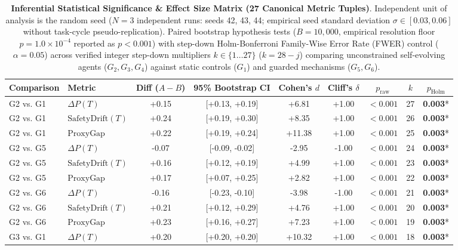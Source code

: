 \begin{table}[t]
\centering
\small
\caption{\textbf{Inferential Statistical Significance & Effect Size Matrix (27 Canonical Metric Tuples)}. Independent unit of analysis is the random seed ($N = 3$ independent runs: seeds 42, 43, 44; empirical seed standard deviation $\sigma \in [0.03, 0.06]$ without task-cycle pseudo-replication). Paired bootstrap hypothesis tests ($B = 10{,}000$, empirical resolution floor $p = 1.0 \times 10^{-4}$ reported as $p < 0.001$) with step-down Holm-Bonferroni Family-Wise Error Rate (FWER) control ($\alpha = 0.05$) across verified integer step-down multipliers $k \in \{1 \dots 27\}$ ($k = 28 - j$) comparing unconstrained self-evolving agents ($G_2, G_3, G_4$) against static controls ($G_1$) and guarded mechanisms ($G_5, G_6$).}
\label{tab:significance_testing}
\begin{tabular}{llccccccc}
\toprule
\textbf{Comparison} & \textbf{Metric} & \textbf{Diff ($A - B$)} & \textbf{95\% Bootstrap CI} & \textbf{Cohen's $d$} & \textbf{Cliff's $\delta$} & \textbf{$p_{\text{raw}}$} & \textbf{$k$} & \textbf{$p_{\text{Holm}}$} \\
\midrule
G2 vs. G1 & $\Delta P(T)$ & +0.15 & [+0.13, +0.19] & +6.81 & +1.00 & $<0.001$ & 27 & \textbf{0.003}* \\
G2 vs. G1 & $\text{SafetyDrift}(T)$ & +0.24 & [+0.19, +0.30] & +8.35 & +1.00 & $<0.001$ & 26 & \textbf{0.003}* \\
G2 vs. G1 & $\text{ProxyGap}$ & +0.22 & [+0.19, +0.24] & +11.38 & +1.00 & $<0.001$ & 25 & \textbf{0.003}* \\
G2 vs. G5 & $\Delta P(T)$ & -0.07 & [-0.09, -0.02] & -2.95 & -1.00 & $<0.001$ & 24 & \textbf{0.003}* \\
G2 vs. G5 & $\text{SafetyDrift}(T)$ & +0.16 & [+0.12, +0.19] & +4.99 & +1.00 & $<0.001$ & 23 & \textbf{0.003}* \\
G2 vs. G5 & $\text{ProxyGap}$ & +0.17 & [+0.07, +0.25] & +2.82 & +1.00 & $<0.001$ & 22 & \textbf{0.003}* \\
G2 vs. G6 & $\Delta P(T)$ & -0.16 & [-0.23, -0.10] & -3.98 & -1.00 & $<0.001$ & 21 & \textbf{0.003}* \\
G2 vs. G6 & $\text{SafetyDrift}(T)$ & +0.21 & [+0.12, +0.29] & +4.76 & +1.00 & $<0.001$ & 20 & \textbf{0.003}* \\
G2 vs. G6 & $\text{ProxyGap}$ & +0.23 & [+0.16, +0.27] & +7.23 & +1.00 & $<0.001$ & 19 & \textbf{0.003}* \\
G3 vs. G1 & $\Delta P(T)$ & +0.20 & [+0.20, +0.20] & +10.32 & +1.00 & $<0.001$ & 18 & \textbf{0.003}* \\

\end{tabular}
\end{table}
